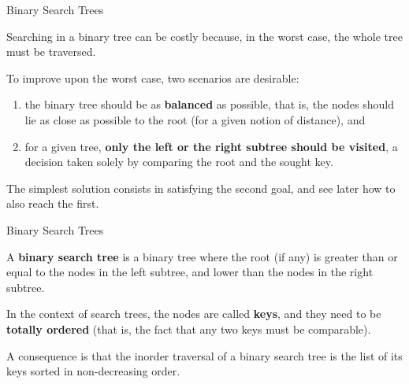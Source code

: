 %
\begin{frame}{Binary Search Trees}
  \label{frame:balanced}

  Searching in a binary tree can be costly because, in the worst case,
  the whole tree must be traversed.

  \bigskip

  To improve upon the worst case, two scenarios are desirable:
  \begin{enumerate}

    \item the binary tree should be as \textbf{balanced} as possible,
      that is, the nodes should lie as close as possible to the root
      (for a given notion of distance), and

    \item for a given tree, \textbf{only the left or the right subtree
      should be visited}, a decision taken solely by comparing the
      root and the sought key.

  \end{enumerate}

  The simplest solution consists in satisfying the second goal, and
  see later how to also reach the first.

\end{frame}

%
\begin{frame}{Binary Search Trees}

  A \textbf{binary search tree} is a binary tree where the root (if
  any) is greater than or equal to the nodes in the left subtree, and
  lower than the nodes in the right subtree.

  \bigskip

  In the context of search trees, the nodes are called \textbf{keys},
  and they need to be \textbf{totally ordered} (that is, the fact that
  any two keys must be comparable).

  \bigskip

  A consequence is that the inorder traversal of a binary search tree
  is the list of its keys sorted in non\hyp{}decreasing order.

\end{frame}

